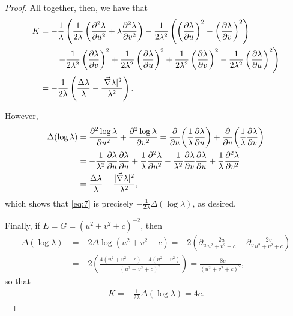 \documentclass[11pt]{article}
\begin{document}
\begin{proof}
All together, then, we have that
\begin{equation}
\label{eq:7}
\begin{aligned}
  K &= -\frac{1}{\lambda}\left( \frac{1}{2\lambda}\left(\pdv[2]{\lambda}{u} + \lambda\pdv[2]{\lambda}{v}\right) - \frac{1}{2\lambda^2}\left(\left( \pdv{\lambda}{u} \right)^2 - \left( \pdv{\lambda}{v} \right)^2\right) \right. \\
  &\qquad \left. - \frac{1}{2\lambda^2}\left( \pdv{\lambda}{v} \right)^2 + \frac{1}{2\lambda^2}\left( \pdv{\lambda}{u} \right)^2 + \frac{1}{2\lambda^2}\left( \pdv{\lambda}{v} \right)^2 - \frac{1}{2\lambda^2}\left( \pdv{\lambda}{u} \right)^2 \right) \\
  &= - \frac{1}{2\lambda}\left( \frac{\Delta\lambda}{\lambda} - \frac{|\vec{\nabla}\lambda|^2}{\lambda^2} \right).
\end{aligned}
\end{equation}

However,
\begin{equation}
\label{eq:8}
\begin{aligned}
  \Delta(\log\lambda) &= \pdv[2]{\log\lambda}{u} + \pdv[2]{\log\lambda}{v} = \pdv{u}(\frac{1}{\lambda}\pdv{\lambda}{u}) + \pdv{v}(\frac{1}{\lambda}\pdv{\lambda}{v}) \\
           &= - \frac{1}{\lambda^2}\pdv{\lambda}{u}\pdv{\lambda}{u} + \frac{1}{\lambda}\pdv[2]{\lambda}{u} - \frac{1}{\lambda^2}\pdv{\lambda}{v}\pdv{\lambda}{u} + \frac{1}{\lambda}\pdv[2]{\lambda}{v} \\ &= \frac{\Delta\lambda}{\lambda} - \frac{|\vec{\nabla}\lambda|^2}{\lambda^2},
\end{aligned}
\end{equation}
which shows that \cref{eq:7} is precisely \( - \frac{1}{2\lambda}\Delta(\log\lambda) \), as desired.

Finally, if \( E = G = (u^2 + v^2 + c)^{-2} \), then
\begin{equation}
\label{eq:9}
\begin{aligned}
  \Delta(\log\lambda) &= -2 \Delta \log(u^2 + v^2 + c) = -2 \left( \partial_u \frac{2u}{u^2 + v^2 + c} + \partial_v \frac{2v}{u^2 + v^2 + c} \right) \\
           &= -2 \left( \frac{4(u^2 + v^2 + c) - 4(u^2 + v^2)}{(u^2 + v^2 + c)^2} \right)
             = \frac{-8c}{(u^2 + v^2 + c)^2},
\end{aligned}
\end{equation}
so that
\begin{equation}
\label{eq:10}
\begin{aligned}
  K = - \frac{1}{2\lambda} \Delta(\log\lambda) = 4c.
\end{aligned}
\end{equation}
\end{proof}
\end{document}
